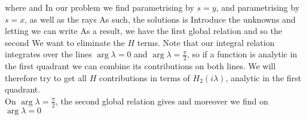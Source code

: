 \documentclass{article}
\begin{document}
where 
and 
In our problem we find 
parametrising by $s = y$, and 
parametrising by $s = x$, as well as the rays 
As such, the solutions is 
Introduce the unknowns 
and letting 
we can write 
As a result, we have the first global relation 
and so the second
We want to eliminate the $H$ terms. Note that our integral relation integrates over the lines $\arg\lambda=0$ and $\arg\lambda=\frac{\pi}{2}$, so if a function is analytic in the first quadrant we can combine its contributions on both lines. We will therefore try to get all $H$ contributions in terms of $H_2(i\lambda)$, analytic in the first quadrant. \\
On $\arg\lambda = \frac{\pi}{2}$, the second global relation gives 
and moreover we find on $\arg\lambda = 0$
\end{document}
